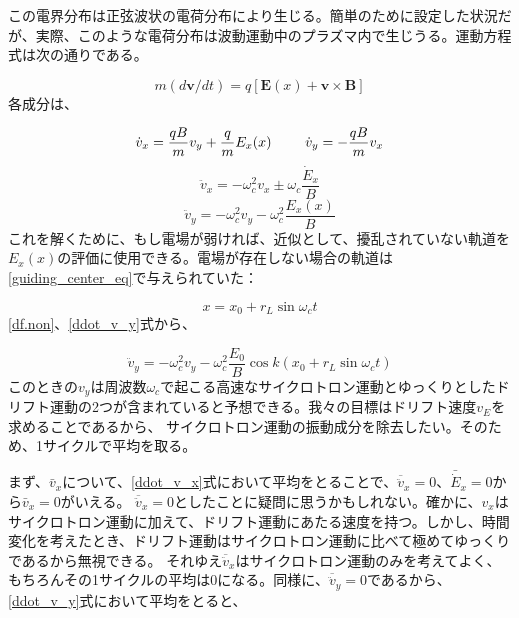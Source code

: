 \documentclass{ltjsarticle}
\numberwithin{equation}{section} %
\begin{document}
 この電界分布は正弦波状の電荷分布により生じる。簡単のために設定した状況だが、実際、このような電荷分布は波動運動中のプラズマ内で生じうる。運動方程式は次の通りである。

 \begin{equation}
  m(d\bm{v}/dt) = q[\bm{E}(x) + \bm{v} \times \bm{B}] 
 \end{equation}
各成分は、

\begin{equation}
  \dot{v}_x = \frac{qB}{m}v_y + \frac{q}{m}E_x(x) \hspace{2pc} \dot{v}_y = -\frac{qB}{m}v_x 
\end{equation}
\begin{equation}
  \ddot{v}_x = -\omega_c ^2 v_x \pm \omega_c \frac{\dot{E}_x}{B} \label{ddot_v_x}
\end{equation}
\begin{equation}
  \ddot{v}_y = -\omega_c ^2 v_y - \omega_c ^2 \frac{E_x(x)}{B} \label{ddot_v_y}
\end{equation}
これを解くために、もし電場が弱ければ、近似として、擾乱されていない軌道を$E_x(x)$の評価に使用できる。電場が存在しない場合の軌道は\eqref{guiding_center_eq}で与えられていた：

\begin{equation}
  x = x_0 +r_L \sin \omega_c t
\end{equation}
\eqref{df.non}、\eqref{ddot_v_y}式から、

\begin{equation}
  \ddot{v}_y = -\omega_c ^2 v_y - \omega_c ^2 \frac{E_0}{B} \cos k(x_0 + r_L \sin \omega_c t)
\end{equation}
このときの$v_y$は周波数$\omega_c$で起こる高速なサイクロトロン運動とゆっくりとしたドリフト運動の2つが含まれていると予想できる。我々の目標はドリフト速度$v_E$を求めることであるから、
サイクロトロン運動の振動成分を除去したい。そのため、1サイクルで平均を取る。

まず、$\bar{v}_x$について、\eqref{ddot_v_x}式において平均をとることで、$\overline{\ddot{v}}_x = 0$、$\bar{\dot{E}}_x = 0$から$\bar{v}_x = 0$がいえる。
$\overline{\ddot{v}}_x = 0$としたことに疑問に思うかもしれない。確かに、$v_x$はサイクロトロン運動に加えて、ドリフト運動にあたる速度を持つ。しかし、時間変化を考えたとき、ドリフト運動はサイクロトロン運動に比べて極めてゆっくりであるから無視できる。
それゆえ$\overline{\ddot{v}}_x$はサイクロトロン運動のみを考えてよく、もちろんその1サイクルの平均は0になる。同様に、$\overline{\ddot{v}}_y = 0$であるから、
\eqref{ddot_v_y}式において平均をとると、
\end{document}

